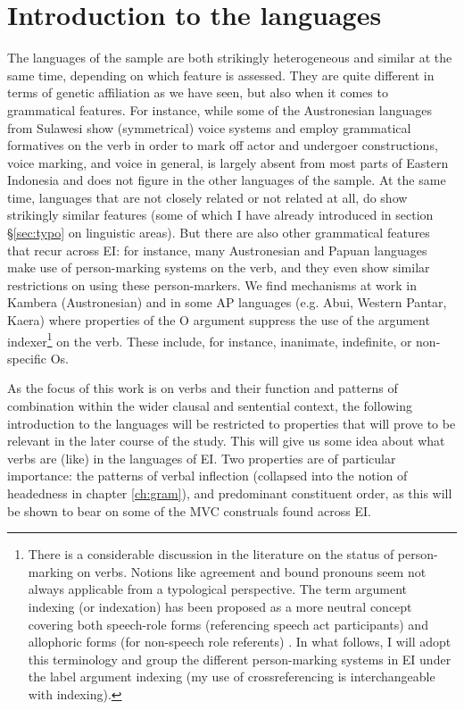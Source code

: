 \section{Introduction to the languages}\label{introlang}

The languages of the sample are both strikingly heterogeneous and similar at the same time, depending on which feature is assessed. They are quite different in terms of genetic affiliation as we have seen, but also when it comes to grammatical features. For instance, while some of the Austronesian languages from Sulawesi show (symmetrical) voice systems and employ grammatical formatives on the verb in order to mark off actor and undergoer constructions, voice marking, and voice in general, is largely absent from most parts of Eastern Indonesia and does not figure in the other languages of the sample. At the same time, languages that are not closely related or not related at all, do show strikingly similar features (some of which I have already introduced in section §\ref{sec:typo} on linguistic areas). But there are also other grammatical features that recur across EI: for instance, many Austronesian and Papuan languages make use of person-marking systems on the verb, and they even show similar restrictions on using these person-markers. We find mechanisms at work in Kambera (Austronesian) and in some AP languages (e.g. Abui, Western Pantar, Kaera) where properties of the O argument suppress the use of the argument indexer\footnote{There is a considerable discussion in the literature on the status of person-marking on verbs. Notions like agreement and bound pronouns seem not always applicable from a typological perspective. The term argument indexing (or indexation) has been proposed as a more neutral concept covering both speech-role forms (referencing speech act participants) and allophoric forms (for non-speech role referents) \parencite{haspelmath2013argument}. In what follows, I will adopt this terminology and group the different person-marking systems in EI under the label argument indexing (my use of crossreferencing is interchangeable with indexing).} on the verb. These include, for instance, inanimate, indefinite, or non-specific Os. 

As the focus of this work is on verbs and their function and patterns of combination within the wider clausal and sentential context, the following introduction to the languages will be restricted to properties that will prove to be relevant in the later course of the study. This will give us some idea about what verbs are (like) in the languages of EI. Two properties are of particular importance: the patterns of verbal inflection (collapsed into the notion of headedness in chapter \ref{ch:gram}), and predominant constituent order, as this will be shown to bear on some of the MVC construals found across EI.

